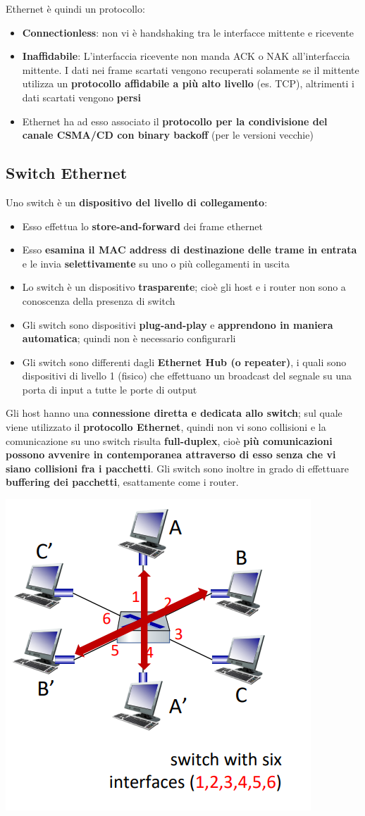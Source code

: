 \documentclass[12pt]{article}
\begin{document}
Ethernet è quindi un protocollo:
\begin{itemize}
    \item \textbf{Connectionless}: non vi è handshaking tra le interfacce mittente e ricevente
    \item \textbf{Inaffidabile}: L'interfaccia ricevente non manda ACK o NAK all'interfaccia mittente. I dati nei frame scartati vengono recuperati
    solamente se il mittente utilizza un \textbf{protocollo affidabile a più alto livello} (es. TCP), altrimenti i dati scartati vengono \textbf{persi}
    \item Ethernet ha ad esso associato il \textbf{protocollo per la condivisione del canale CSMA/CD con binary backoff} (per le versioni vecchie)
\end{itemize}
\subsection{Switch Ethernet}
Uno switch è un \textbf{dispositivo del livello di collegamento}:
\begin{itemize}
    \item Esso effettua lo \textbf{store-and-forward} dei frame ethernet
    \item Esso \textbf{esamina il MAC address di destinazione delle trame in entrata} e le invia \textbf{selettivamente} su uno o più collegamenti in uscita
    \item Lo switch è un dispositivo \textbf{trasparente}; cioè gli host e i router non sono a conoscenza della presenza di switch
    \item Gli switch sono dispositivi \textbf{plug-and-play} e \textbf{apprendono in maniera automatica}; quindi non è necessario configurarli
    \item Gli switch sono differenti dagli \textbf{Ethernet Hub (o repeater)}, i quali sono dispositivi di livello 1 (fisico) che effettuano un broadcast del segnale su una porta di input a tutte le porte di output
\end{itemize}
Gli host hanno una \textbf{connessione diretta e dedicata allo switch}; sul quale viene utilizzato il \textbf{protocollo Ethernet}, quindi non vi sono collisioni e la comunicazione su uno switch risulta \textbf{full-duplex}, cioè \textbf{più comunicazioni possono avvenire in contemporanea attraverso di esso senza che vi siano collisioni fra i pacchetti}.
Gli switch sono inoltre in grado di effettuare \textbf{buffering dei pacchetti}, esattamente come i router.  
\begin{center}
    \includegraphics[width =0.40\linewidth]{Images/138.png}
\end{center}
\end{document}
